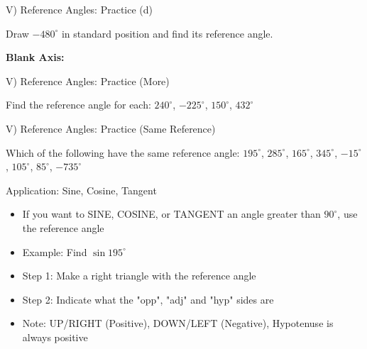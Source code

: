 \documentclass[aspectratio=169]{beamer}
\begin{document}
\begin{frame}{V) Reference Angles: Practice (d)}
\begin{tcolorbox}[colback=lightgray,colframe=accent,title=Practice: Find the Reference Angle]
\footnotesize
Draw $-480^\circ$ in standard position and find its reference angle.

\vspace{1em}

\textbf{Blank Axis:}

\begin{center}
\end{center}
\end{tcolorbox}
\end{frame}

\begin{frame}{V) Reference Angles: Practice (More)}
\begin{tcolorbox}[colback=lightgray,colframe=accent,title=Practice]
\footnotesize
Find the reference angle for each: $240^\circ$, $-225^\circ$, $150^\circ$, $432^\circ$
\end{tcolorbox}
\end{frame}

\begin{frame}{V) Reference Angles: Practice (Same Reference)}
\begin{tcolorbox}[colback=lightgray,colframe=accent,title=Practice]
\footnotesize
Which of the following have the same reference angle: $195^\circ$, $285^\circ$, $165^\circ$, $345^\circ$, $-15^\circ$, $105^\circ$, $85^\circ$, $-735^\circ$
\end{tcolorbox}
\end{frame}

\begin{frame}{Application: Sine, Cosine, Tangent}
    \begin{tcolorbox}[colback=lightgray,colframe=primary,title=Application]
        \footnotesize
        \begin{itemize}
            \item If you want to SINE, COSINE, or TANGENT an angle greater than $90^\circ$, use the reference angle
            \item Example: Find $\sin 195^\circ$
            \item Step 1: Make a right triangle with the reference angle
            \item Step 2: Indicate what the "opp", "adj" and "hyp" sides are
            \item Note: UP/RIGHT (Positive), DOWN/LEFT (Negative), Hypotenuse is always positive
        \end{itemize}
    \end{tcolorbox}
\end{frame}
\end{document}
